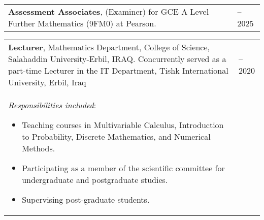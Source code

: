 \documentclass[line]{res}
\newenvironment{p1}
{\begin{adjustwidth}{-30pt}{0pt}
\vspace{8pt}}
{\end{adjustwidth}}
\begin{document}
\begin{resume}
\begin{p1}
\vspace{5pt}
\begin{tabular}{p{} >{\raggedleft\arraybackslash}p{}}
	\textbf{Assessment Associates}, (Examiner) for GCE A Level Further Mathematics (9FM0) at Pearson. & 2022--2025\\
\end{tabular}

\vspace{5pt}
\begin{tabular}{p{} >{\raggedleft\arraybackslash}p{}}
	\textbf{Lecturer}, Mathematics Department, College of Science, Salahaddin University-Erbil, IRAQ.  Concurrently served as a part-time Lecturer in the IT Department, Tishk International University, Erbil, Iraq& 2019--2020 \\
	\textit{Responsibilities included}:
	\begin{itemize}
		\item Teaching courses in Multivariable Calculus, Introduction to Probability, Discrete Mathematics, and Numerical Methods.
		\item Participating as a member of the scientific committee for undergraduate and postgraduate studies.
		\item Supervising post-graduate students.	
	\end{itemize}
\end{tabular}


\end{p1}
\end{resume}
\end{document}
